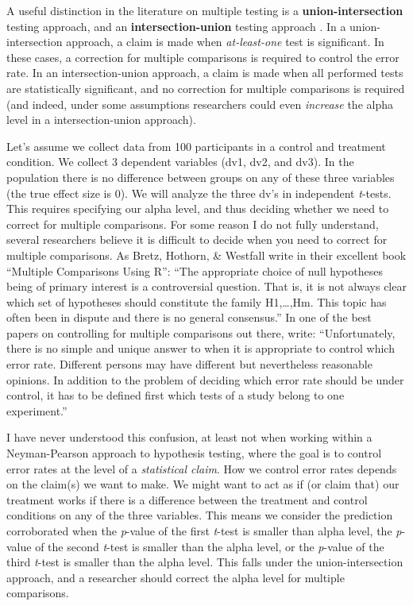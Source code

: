 \documentclass[
  oneside]{krantz}
\begin{document}
A useful distinction in the literature on multiple testing is a \textbf{union-intersection} testing approach, and an \textbf{intersection-union} testing approach \citep{dmitrienko_traditional_2013}. In a union-intersection approach, a claim is made when \emph{at-least-one} test is significant. In these cases, a correction for multiple comparisons is required to control the error rate. In an intersection-union approach, a claim is made when all performed tests are statistically significant, and no correction for multiple comparisons is required (and indeed, under some assumptions researchers could even \emph{increase} the alpha level in a intersection-union approach).

Let's assume we collect data from 100 participants in a control and treatment condition. We collect 3 dependent variables (dv1, dv2, and dv3). In the population there is no difference between groups on any of these three variables (the true effect size is 0). We will analyze the three dv's in independent \emph{t}-tests. This requires specifying our alpha level, and thus deciding whether we need to correct for multiple comparisons. For some reason I do not fully understand, several researchers believe it is difficult to decide when you need to correct for multiple comparisons. As Bretz, Hothorn, \& Westfall \citeyearpar{bretz_multiple_2011} write in their excellent book ``Multiple Comparisons Using R'': ``The appropriate choice of null hypotheses being of primary interest is a controversial question. That is, it is not always clear which set of hypotheses should constitute the family H1,\ldots,Hm. This topic has often been in dispute and there is no general consensus.'' In one of the best papers on controlling for multiple comparisons out there, \citet{bender_adjusting_2001} write: ``Unfortunately, there is no simple and unique answer to when it is appropriate to control which error rate. Different persons may have different but nevertheless reasonable opinions. In addition to the problem of deciding which error rate should be under control, it has to be defined first which tests of a study belong to one experiment.''

I have never understood this confusion, at least not when working within a Neyman-Pearson approach to hypothesis testing, where the goal is to control error rates at the level of a \emph{statistical claim}. How we control error rates depends on the claim(s) we want to make. We might want to act as if (or claim that) our treatment works if there is a difference between the treatment and control conditions on any of the three variables. This means we consider the prediction corroborated when the \emph{p}-value of the first \emph{t}-test is smaller than alpha level, the \emph{p}-value of the second \emph{t}-test is smaller than the alpha level, or the \emph{p}-value of the third \emph{t}-test is smaller than the alpha level. This falls under the union-intersection approach, and a researcher should correct the alpha level for multiple comparisons.
\end{document}

